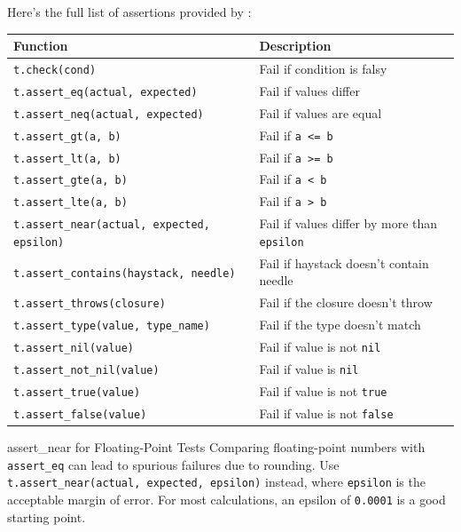 Here's the full list of assertions provided by :

\begin{longtable}{@{}lp{8cm}@{}}
\toprule
\textbf{Function} & \textbf{Description} \\
\midrule
\endhead
\lstinline|t.check(cond)| & Fail if condition is falsy \\
\lstinline|t.assert_eq(actual, expected)| & Fail if values differ \\
\lstinline|t.assert_neq(actual, expected)| & Fail if values are equal \\
\lstinline|t.assert_gt(a, b)| & Fail if \lstinline|a <= b| \\
\lstinline|t.assert_lt(a, b)| & Fail if \lstinline|a >= b| \\
\lstinline|t.assert_gte(a, b)| & Fail if \lstinline|a < b| \\
\lstinline|t.assert_lte(a, b)| & Fail if \lstinline|a > b| \\
\lstinline|t.assert_near(actual, expected, epsilon)| & Fail if values differ by more than \lstinline|epsilon| \\
\lstinline|t.assert_contains(haystack, needle)| & Fail if haystack doesn't contain needle \\
\lstinline|t.assert_throws(closure)| & Fail if the closure doesn't throw \\
\lstinline|t.assert_type(value, type_name)| & Fail if the type doesn't match \\
\lstinline|t.assert_nil(value)| & Fail if value is not \lstinline|nil| \\
\lstinline|t.assert_not_nil(value)| & Fail if value is \lstinline|nil| \\
\lstinline|t.assert_true(value)| & Fail if value is not \lstinline|true| \\
\lstinline|t.assert_false(value)| & Fail if value is not \lstinline|false| \\
\bottomrule
\end{longtable}

\begin{tipbox}{assert\_near for Floating-Point Tests}
Comparing floating-point numbers with \lstinline|assert_eq| can lead to spurious failures due to rounding.
Use \lstinline|t.assert_near(actual, expected, epsilon)| instead, where \lstinline|epsilon| is the acceptable margin of error.
For most calculations, an epsilon of \lstinline|0.0001| is a good starting point.
\end{tipbox}

